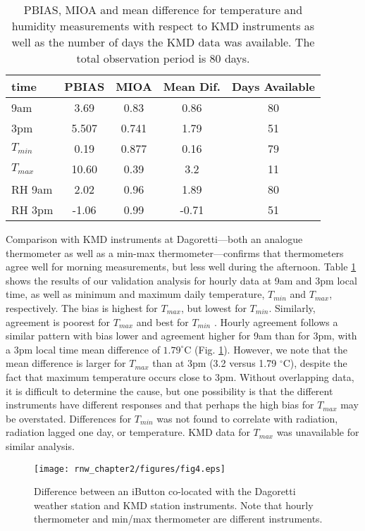 \begin{table}
\centering
\begin{tabular}{ l | c | c | c | c }
     time & PBIAS & MIOA & Mean Dif. & Days Available\\ \hline
    9am &  3.69 & 0.83 & 0.86 & 80 \\ 
    3pm & 5.507 & 0.741 & 1.79 & 51\\
    $T_{min}$ &  0.19 & 0.877 & 0.16 & 79\\
    $T_{max}$ & 10.60 & 0.39 & 3.2 & 11\\
    RH 9am & 2.02 & 0.96 & 1.89 & 80\\
    RH 3pm &-1.06  & 0.99 & -0.71 & 51\\ 
    \hline
\end{tabular}

\caption{PBIAS, MIOA and mean difference for temperature and humidity measurements with respect to KMD instruments as well as the number of days the KMD data was available. The total observation period is 80 days.}
\label{tab:validation}
\end{table}

Comparison with KMD instruments at Dagoretti---both an analogue thermometer as well as a min-max thermometer---confirms that thermometers agree well for morning measurements, but less well during the afternoon.
Table \ref{tab:validation} shows the results of our validation analysis for hourly data at 9am and 3pm local time, as well as minimum and maximum daily temperature, $T_{min}$ and $T_{max}$, respectively.
 The bias is highest for $T_{max}$, but lowest for $T_{min}$. Similarly, agreement is poorest for $T_{max}$ and best for $T_{min}$ . 
Hourly agreement follows a similar pattern with bias lower and agreement higher for 9am than for 3pm, with a 3pm local time mean difference of $1.79^\circ$C (Fig. \ref{validation}). However, we note that the mean difference is larger for $T_{max}$ than at 3pm (3.2 versus 1.79 $^\circ$C), despite the fact that maximum temperature occurs close to 3pm. Without overlapping data, it is difficult to determine the cause, but one possibility is that the different instruments have different responses and that perhaps the high bias for $T_{max}$ may be overstated. 
Differences for $T_{min}$ was not found to correlate with radiation, radiation lagged one day, or temperature. KMD data for $T_{max}$ was unavailable for similar analysis. 


\begin{figure}
\texttt{[image: rnw\_chapter2/figures/fig4.eps]}
\caption{Difference between an iButton co-located with the Dagoretti weather station and KMD station instruments. Note that hourly thermometer and min/max thermometer are different instruments.}

\label{validation}
\end{figure}

